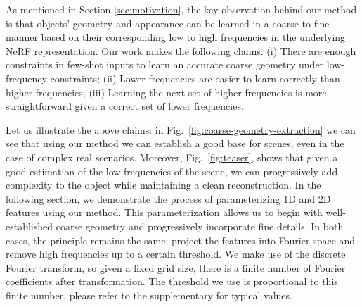As mentioned in Section \ref{sec:motivation}, the key observation behind our method is that objects' geometry and appearance can be learned in a coarse-to-fine manner based on their corresponding low to high frequencies in the underlying NeRF representation.
%
Our work makes the following claims:
(i) There are enough constraints in few-shot inputs to learn an accurate coarse geometry under low-frequency constraints;
(ii) Lower frequencies are easier to learn correctly than higher frequencies; 
(iii) Learning the next set of higher frequencies is more straightforward given a correct set of lower frequencies. 

Let us illustrate the above claims: in Fig.~\ref{fig:coarse-geometry-extraction} we can see that using our method we can establish a good base for scenes, even in the case of complex real scenarios. Moreover, Fig.~\ref{fig:teaser}, shows that given a good estimation of the low-frequencies of the scene, we can progressively add complexity to the object while maintaining a clean reconstruction.
%
In the following section, we demonstrate the process of parameterizing 1D and 2D features using our method. This parameterization allows us to begin with well-established coarse geometry and progressively incorporate fine details. In both cases, the principle remains the same: project the features into Fourier space and remove high frequencies up to a certain threshold. We make use of the discrete Fourier transform, so given a fixed grid size, there is a finite number of Fourier coefficients after transformation. The threshold we use is proportional to this finite number, please refer to the supplementary for typical values.

